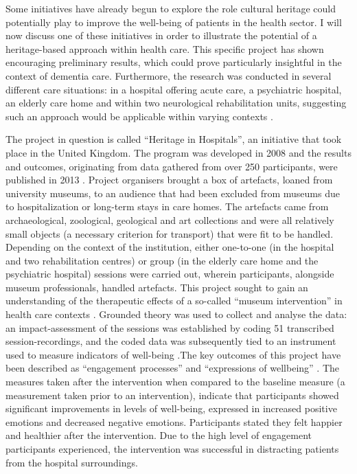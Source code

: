 Some
initiatives have already begun to explore the role cultural heritage could potentially 
play to improve the well-being of patients in the health sector. 
I will now discuss one of these initiatives in order to illustrate the potential 
of a heritage-based approach within health care. This specific project has shown 
encouraging preliminary results, which could prove particularly insightful in the 
context of dementia care. Furthermore, the research was conducted in several different 
care situations: in a hospital offering acute care, a psychiatric hospital, an elderly 
care home and within two neurological rehabilitation units, suggesting such an 
approach would be applicable within varying contexts \parencite[231--232]{AnderE_2013}.	
	
	
The project in question is called “Heritage in Hospitals”,
an initiative that took place in the United Kingdom. The program was developed in 
2008 and the results and outcomes, originating from data gathered from over 
250 participants, were published in 2013 \parencite{AnderE_2013}. 
Project organisers brought a box of artefacts, loaned from university museums, 
to an audience that had been excluded from museums due to hospitalization or 
long-term stays in care homes. The artefacts came from archaeological, zoological, 
geological and art collections and were all relatively small objects (a necessary 
criterion for transport) that were fit to be handled. Depending on the context of 
the institution, either one-to-one (in the hospital and two rehabilitation centres) 
or group (in the elderly care home and the psychiatric hospital) sessions were carried 
out, wherein participants, alongside museum professionals, handled artefacts.	
This project sought to gain an understanding of the therapeutic effects of a so-called 
“museum intervention” in health care contexts \parencite[230--232]{AnderE_2013}. 
Grounded theory was used to collect and analyse the data: an impact-assessment of the 
sessions was established by coding 51 transcribed session-recordings, and the coded data 
was subsequently tied to an instrument used to measure indicators of 
well-being \parencite[237--239]{AnderE_2013}.The key outcomes of this project have been
described as “engagement processes” and “expressions of wellbeing” 
\parencite[234]{AnderE_2013}. The measures taken after the intervention when compared to 
the baseline measure (a measurement taken prior to an intervention), indicate that 
participants showed significant improvements in  levels of well-being, expressed 
in increased positive emotions and decreased negative emotions. 
Participants stated they felt happier and healthier after the intervention. 
Due to the high level of engagement participants experienced, the intervention 
was successful in distracting patients from the hospital surroundings. 
	
